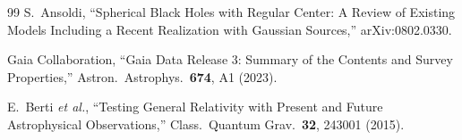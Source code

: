 \documentclass[11pt,a4paper]{article}
\begin{document}
\begin{thebibliography}{99}
S.~Ansoldi,
``Spherical Black Holes with Regular Center: A Review of Existing Models Including a Recent Realization with Gaussian Sources,''
arXiv:0802.0330.

Gaia Collaboration,
``Gaia Data Release 3: Summary of the Contents and Survey Properties,''
Astron.\ Astrophys.\ \textbf{674}, A1 (2023).

E.~Berti \textit{et al.},
``Testing General Relativity with Present and Future Astrophysical Observations,''
Class.\ Quantum Grav.\ \textbf{32}, 243001 (2015).

\end{thebibliography}
\end{document}
